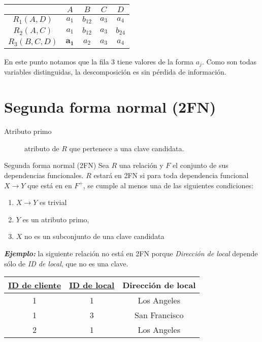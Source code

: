 \documentclass[a4paper, twoside]{article}
\begin{document}
\begin{center}
	\begin{tabular}{|c|c|c|c|c|}
		\hline 
		 & $A$ & $B$ & $C$ & $D$\\
		\hline 
		\hline 
		$R_{1}(A,D)$ & $a_{1}$ & $b_{12}$ & $a_{3}$ & $a_{4}$\\
		\hline 
		$R_{2}(A,C)$ & $a_{1}$ & $b_{12}$ & $a_{3}$ & $b_{24}$\\
		\hline 
		$R_{3}(B,C,D)$ & $\mathbf{a_{1}}$ & $a_{2}$ & $a_{3}$ & \textbf{$a_{4}$}\\
		\hline 
	\end{tabular}
\end{center}

En este punto notamos que la fila 3 tiene valores de la forma $a_{j}$. Como son todas variables distinguidas, la descomposición es sin pérdida de información.

\section{Segunda forma normal (2FN)}
\begin{description}
	\item[Atributo primo] atributo de $R$ que pertenece a una clave candidata.
\end{description}

\begin{definicion}[0.9\textwidth]{Segunda forma normal (2FN)}
	Sea $R$ una relación y $F$ el conjunto de sus dependencias funcionales. $R$ estará en 2FN si para toda dependencia funcional $X\to Y$ que está en en $F^{+}$, se cumple al menos una de las siguientes condiciones:
	\begin{enumerate}
		\item $X\to Y$ es trivial
		\item $Y$ es un atributo primo,
		\item $X$ no es un subconjunto de una clave candidata
	\end{enumerate}
\end{definicion}


\textbf{\emph{Ejemplo:}} la siguiente relación no está en 2FN porque \emph{Dirección de local} depende sólo de \emph{ID de local}, que no es una clave.

\begin{center}
	\begin{tabular}{|c|c|c|}
		\hline 
		\uline{ID de cliente} & \uline{ID de local} & Dirección de local\\
		\hline 
		\hline 
		1 & 1 & Los Angeles\\
		\hline 
		1 & 3 & San Francisco\\
		\hline 
		2 & 1 & Los Angeles\\
		\hline 
	\end{tabular}
\end{center}
\end{document}
